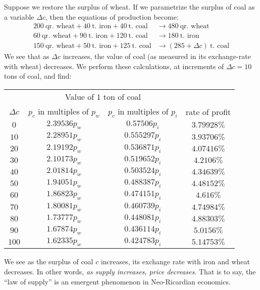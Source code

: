   Suppose we restore the surplus of wheat.
  If we parametrize the surplus of coal as a variable $\Delta c$, then the
  equations of production become:
  \begin{subequations}
    \begin{align}
      200~\mbox{qr. wheat} + 40~\mbox{t. iron} + 40~\mbox{t. coal} &\to 480~\mbox{qr. wheat}\\
      60~\mbox{qr. wheat} + 90~\mbox{t. iron} + 120~\mbox{t. coal} &\to 180~\mbox{t. iron}\\
      150~\mbox{qr. wheat} + 50~\mbox{t. iron} + 125~\mbox{t. coal} &\to (285+\Delta c)~\mbox{t. coal}
    \end{align}
  \end{subequations}
  We see that as $\Delta c$ increases, the value of coal (as measured in its
  exchange-rate with wheat) decreases. We perform these calculations,
  at increments of $\Delta c=10$ tons of coal, and find:
  \begin{center}
    \begin{tabular}{cccc}
      \toprule
      &\multicolumn{2}{c}{Value of 1 ton of coal}&\\
      \cmidrule(r){2-3}
    $\Delta c$ & $p_{c}$ in multiples of $p_{w}$ & $p_{c}$ in multiples of $p_{i}$&rate of profit\\ \midrule
 $0$ & $ 2.39536 p_{w}$ & $ 0.57506 p_{i}$ & $3.79928\%$\\
$10$ & $ 2.28951 p_{w}$ & $ 0.555297 p_{i}$ & $3.93706\%$\\
$20$ & $ 2.19192 p_{w}$ & $ 0.536871 p_{i}$ & $4.07416\%$\\
$30$ & $ 2.10173 p_{w}$ & $ 0.519652 p_{i}$ & $4.2106\%$\\
$40$ & $ 2.01814 p_{w}$ & $ 0.503524 p_{i}$ & $4.34639\%$\\
$50$ & $ 1.94051 p_{w}$ & $ 0.488387 p_{i}$ & $4.48152\%$\\
$60$ & $ 1.86823 p_{w}$ & $ 0.474151 p_{i}$ & $4.616\%$\\
$70$ & $ 1.80081 p_{w}$ & $ 0.460739 p_{i}$ & $4.74984\%$\\
$80$ & $ 1.73777 p_{w}$ & $ 0.448081 p_{i}$ & $4.88303\%$\\
$90$ & $ 1.67874 p_{w}$ & $ 0.436114 p_{i}$ & $5.0156\%$\\
$100$ & $ 1.62335 p_{w}$ & $ 0.424783 p_{i}$ & $5.14753\%$\\
    \bottomrule
  \end{tabular}
  \end{center}
  We see as the surplus of coal $c$ increases, its exchange rate with
  iron and wheat decreases. In other words, \emph{as supply increases, price decreases}.
  That is to say, the ``law of supply'' is an emergent phenomenon in
  Neo-Ricardian economics.

